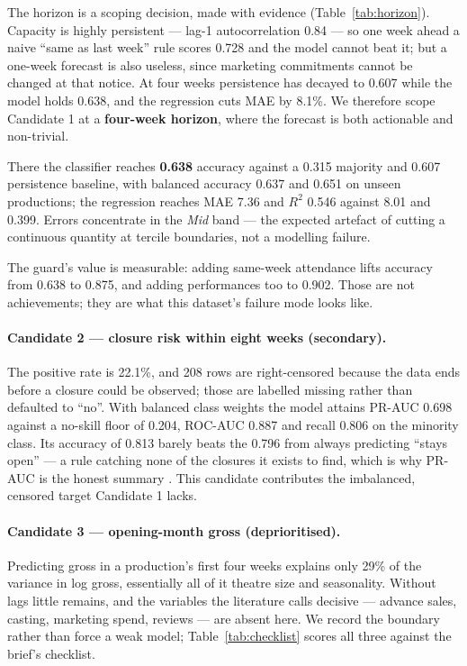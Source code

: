 The horizon is a scoping decision, made with evidence
(Table~\ref{tab:horizon}). Capacity is highly persistent --- lag-1
autocorrelation 0.84 --- so one week ahead a naive ``same as last week'' rule
scores 0.728 and the model cannot beat it; but a one-week forecast is also
useless, since marketing commitments cannot be changed at that notice. At four
weeks persistence has decayed to 0.607 while the model holds 0.638, and the
regression cuts MAE by 8.1\%. We therefore scope Candidate 1 at a
\textbf{four-week horizon}, where the forecast is both actionable and
non-trivial.

There the classifier reaches \textbf{0.638} accuracy against a 0.315 majority
and 0.607 persistence baseline, with balanced accuracy 0.637 and 0.651 on unseen
productions; the regression reaches MAE 7.36 and $R^2$ 0.546 against 8.01 and
0.399. Errors concentrate in the \emph{Mid} band --- the expected artefact of
cutting a continuous quantity at tercile boundaries, not a modelling failure.

The guard's value is measurable: adding same-week attendance lifts accuracy from
0.638 to 0.875, and adding performances too to 0.902. Those are not
achievements; they are what this dataset's failure mode looks like.

\paragraph{Candidate 2 --- closure risk within eight weeks (secondary).}
The positive rate is 22.1\%, and 208 rows are right-censored because the data
ends before a closure could be observed; those are labelled missing rather than
defaulted to ``no''. With balanced class weights the model attains PR-AUC 0.698
against a no-skill floor of 0.204, ROC-AUC 0.887 and recall 0.806 on the
minority class. Its accuracy of 0.813 barely beats the 0.796 from always
predicting ``stays open'' --- a rule catching none of the closures it exists to
find, which is why PR-AUC is the honest summary \citep{saito2015prplot}. This
candidate contributes the imbalanced, censored target Candidate 1 lacks.

\paragraph{Candidate 3 --- opening-month gross (deprioritised).}
Predicting gross in a production's first four weeks explains only 29\% of the
variance in log gross, essentially all of it theatre size and seasonality.
Without lags little remains, and the variables the literature calls decisive ---
advance sales, casting, marketing spend, reviews \citep{reddy1998broadway} ---
are absent here. We record the boundary rather than force a weak model;
Table~\ref{tab:checklist} scores all three against the brief's checklist.

